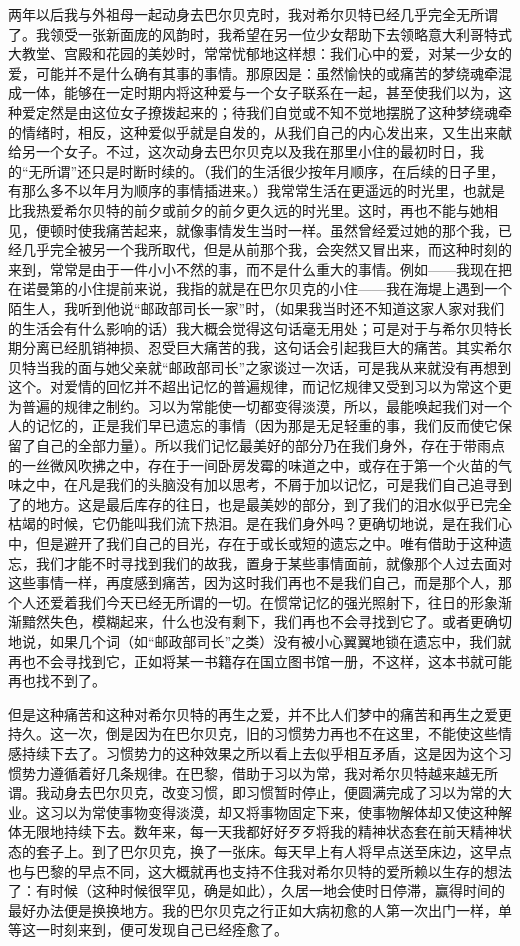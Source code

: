 \par 两年以后我与外祖母一起动身去巴尔贝克时，我对希尔贝特已经几乎完全无所谓了。我领受一张新面庞的风韵时，我希望在另一位少女帮助下去领略意大利哥特式大教堂、宫殿和花园的美妙时，常常忧郁地这样想：我们心中的爱，对某一少女的爱，可能并不是什么确有其事的事情。那原因是：虽然愉快的或痛苦的梦绕魂牵混成一体，能够在一定时期内将这种爱与一个女子联系在一起，甚至使我们以为，这种爱定然是由这位女子撩拨起来的；待我们自觉或不知不觉地摆脱了这种梦绕魂牵的情绪时，相反，这种爱似乎就是自发的，从我们自己的内心发出来，又生出来献给另一个女子。不过，这次动身去巴尔贝克以及我在那里小住的最初时日，我的“无所谓”还只是时断时续的。（我们的生活很少按年月顺序，在后续的日子里，有那么多不以年月为顺序的事情插进来。）我常常生活在更遥远的时光里，也就是比我热爱希尔贝特的前夕或前夕的前夕更久远的时光里。这时，再也不能与她相见，便顿时使我痛苦起来，就像事情发生当时一样。虽然曾经爱过她的那个我，已经几乎完全被另一个我所取代，但是从前那个我，会突然又冒出来，而这种时刻的来到，常常是由于一件小小不然的事，而不是什么重大的事情。例如——我现在把在诺曼第的小住提前来说，我指的就是在巴尔贝克的小住——我在海堤上遇到一个陌生人，我听到他说“邮政部司长一家”时，（如果我当时还不知道这家人家对我们的生活会有什么影响的话）我大概会觉得这句话毫无用处；可是对于与希尔贝特长期分离已经肌销神损、忍受巨大痛苦的我，这句话会引起我巨大的痛苦。其实希尔贝特当我的面与她父亲就“邮政部司长”之家谈过一次话，可是我从来就没有再想到这个。对爱情的回忆并不超出记忆的普遍规律，而记忆规律又受到习以为常这个更为普遍的规律之制约。习以为常能使一切都变得淡漠，所以，最能唤起我们对一个人的记忆的，正是我们早已遗忘的事情（因为那是无足轻重的事，我们反而使它保留了自己的全部力量）。所以我们记忆最美好的部分乃在我们身外，存在于带雨点的一丝微风吹拂之中，存在于一间卧房发霉的味道之中，或存在于第一个火苗的气味之中，在凡是我们的头脑没有加以思考，不屑于加以记忆，可是我们自己追寻到了的地方。这是最后库存的往日，也是最美妙的部分，到了我们的泪水似乎已完全枯竭的时候，它仍能叫我们流下热泪。是在我们身外吗？更确切地说，是在我们心中，但是避开了我们自己的目光，存在于或长或短的遗忘之中。唯有借助于这种遗忘，我们才能不时寻找到我们的故我，置身于某些事情面前，就像那个人过去面对这些事情一样，再度感到痛苦，因为这时我们再也不是我们自己，而是那个人，那个人还爱着我们今天已经无所谓的一切。在惯常记忆的强光照射下，往日的形象渐渐黯然失色，模糊起来，什么也没有剩下，我们再也不会寻找到它了。或者更确切地说，如果几个词（如“邮政部司长”之类）没有被小心翼翼地锁在遗忘中，我们就再也不会寻找到它，正如将某一书籍存在国立图书馆一册，不这样，这本书就可能再也找不到了。
\par 但是这种痛苦和这种对希尔贝特的再生之爱，并不比人们梦中的痛苦和再生之爱更持久。这一次，倒是因为在巴尔贝克，旧的习惯势力再也不在这里，不能使这些情感持续下去了。习惯势力的这种效果之所以看上去似乎相互矛盾，这是因为这个习惯势力遵循着好几条规律。在巴黎，借助于习以为常，我对希尔贝特越来越无所谓。我动身去巴尔贝克，改变习惯，即习惯暂时停止，便圆满完成了习以为常的大业。这习以为常使事物变得淡漠，却又将事物固定下来，使事物解体却又使这种解体无限地持续下去。数年来，每一天我都好好歹歹将我的精神状态套在前天精神状态的套子上。到了巴尔贝克，换了一张床。每天早上有人将早点送至床边，这早点也与巴黎的早点不同，这大概就再也支持不住我对希尔贝特的爱所赖以生存的想法了：有时候（这种时候很罕见，确是如此），久居一地会使时日停滞，赢得时间的最好办法便是换换地方。我的巴尔贝克之行正如大病初愈的人第一次出门一样，单等这一时刻来到，便可发现自己已经痊愈了。
